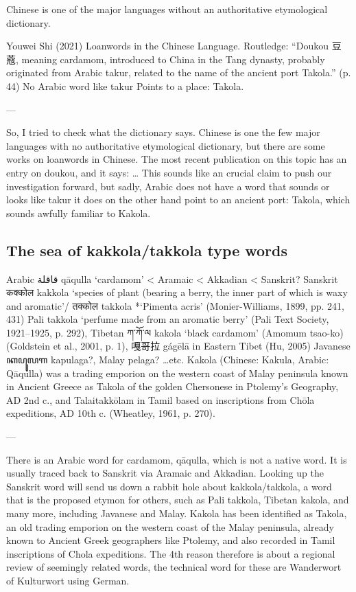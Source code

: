 \documentclass[12pt]{article}
\begin{document}
Chinese is one of the major languages without an authoritative etymological dictionary. 


Youwei Shi (2021) Loanwords in the Chinese Language. Routledge:
	“Doukou 豆蔻, meaning cardamom, introduced to China in the 	Tang dynasty, probably originated from Arabic takur, related to 	the name of the ancient port Takola.” (p. 44)
No Arabic word like takur
Points to a place: Takola.

---

So, I tried to check what the dictionary says. Chinese is one the few major languages with no authoritative etymological dictionary, but there are some works on loanwords in Chinese. The most recent publication on this topic has an entry on doukou, and it says: 
…
This sounds like an crucial claim to push our investigation forward, 
but sadly, Arabic does not have a word that sounds or looks like takur
it does on the other hand point to an ancient port: Takola, which sounds awfully familiar to Kakola.





\subsection{The sea of kakkola/takkola type words}

Arabic قاقلة qāqulla ‘cardamom’ < Aramaic < Akkadian < Sanskrit?
Sanskrit कक्कोल kakkola ‘species of plant (bearing a berry, the inner part of which is waxy and aromatic’/ तक्कोल takkola *‘Pimenta acris’ (Monier-Williams, 1899, pp. 241, 431)
Pali takkola ‘perfume made from an aromatic berry’ (Pali Text Society, 1921–1925, p. 292),
Tibetan ཀ་ཀོ་ལ kakola ‘black cardamom’ (Amomum tsao-ko) (Goldstein et al., 2001, p. 1), 嘎哥拉 gágēlā in Eastern Tibet (Hu, 2005)
Javanese ꦏꦥꦸꦭꦒ kapulaga?, Malay pelaga? …etc.
Kakola (Chinese: Kakula, Arabic: Qāqulla) was a trading emporion on the western coast of Malay peninsula known in Ancient Greece as Takola of the golden Chersonese in Ptolemy’s Geography, AD 2nd c., and Talaitakkōlam in Tamil based on inscriptions from Chōla expeditions, AD 10th c. (Wheatley, 1961, p. 270).

---

There is an Arabic word for cardamom, qāqulla, which is not a native word. It is usually traced back to Sanskrit via Aramaic and Akkadian.
Looking up the Sanskrit word will send us down a rabbit hole about kakkola/takkola, a word that is the proposed etymon for others, such as Pali takkola, Tibetan kakola, and many more, including Javanese and Malay.
Kakola has been identified as Takola, an old trading emporion on the western coast of the Malay peninsula, already known to Ancient Greek geographers like Ptolemy, and also recorded in Tamil inscriptions of Chola expeditions.
The 4th reason therefore is about a regional review of seemingly related words, the technical word for these are Wanderwort of Kulturwort using German. 
\end{document}
